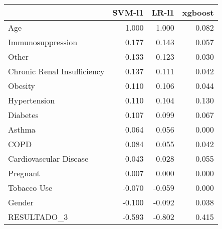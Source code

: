 \begin{tabular}{lrrr}
\toprule
{} &  SVM-l1 &  LR-l1 &  xgboost \\
\midrule
Age                         &   1.000 &  1.000 &    0.082 \\
Immunosuppression           &   0.177 &  0.143 &    0.057 \\
Other                       &   0.133 &  0.123 &    0.030 \\
Chronic Renal Insufficiency &   0.137 &  0.111 &    0.042 \\
Obesity                     &   0.110 &  0.106 &    0.044 \\
Hypertension                &   0.110 &  0.104 &    0.130 \\
Diabetes                    &   0.107 &  0.099 &    0.067 \\
Asthma                      &   0.064 &  0.056 &    0.000 \\
COPD                        &   0.084 &  0.055 &    0.042 \\
Cardiovascular Disease      &   0.043 &  0.028 &    0.055 \\
Pregnant                    &   0.007 &  0.000 &    0.000 \\
Tobacco Use                 &  -0.070 & -0.059 &    0.000 \\
Gender                      &  -0.100 & -0.092 &    0.038 \\
RESULTADO\_3                 &  -0.593 & -0.802 &    0.415 \\
\bottomrule
\end{tabular}
